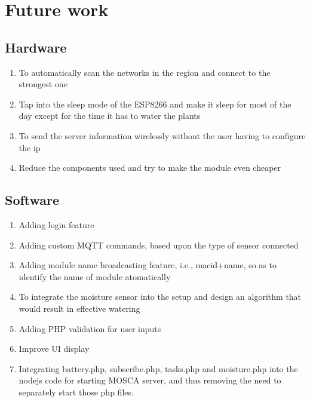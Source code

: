 \documentclass[16pt]{article}
\begin{document}
\vspace{19cm}

\section{Future work}

\vspace{0.5cm}

\subsection{Hardware}
\begin{enumerate}
 \item To automatically scan the networks in the region and connect to the strongest one
 \item Tap into the sleep mode of the ESP8266 and make it sleep for most of the day except for the time 
 it has to water the plants
 \item To send the server information wirelessly without the user having to configure the ip
 \item Reduce the components used and try to make the module even cheaper  
\end{enumerate}

\vspace{0.5cm}

\subsection{Software}
\begin{enumerate}
 \item Adding login feature
 \item Adding custom MQTT commands, based upon the type of sensor connected
 \item Adding module name broadcasting feature, i.e., macid+name, so as to identify the name of module atomatically
 \item To integrate the moisture sensor into the setup and design an algorithm that would result in effective watering
 \item Adding PHP validation for user inputs
 \item Improve UI display
 \item Integrating battery.php, subscribe.php, tasks.php and moisture.php into the nodejs code for starting MOSCA server, and thus removing the need to separately start those php files.
\end{enumerate}
\end{document}
